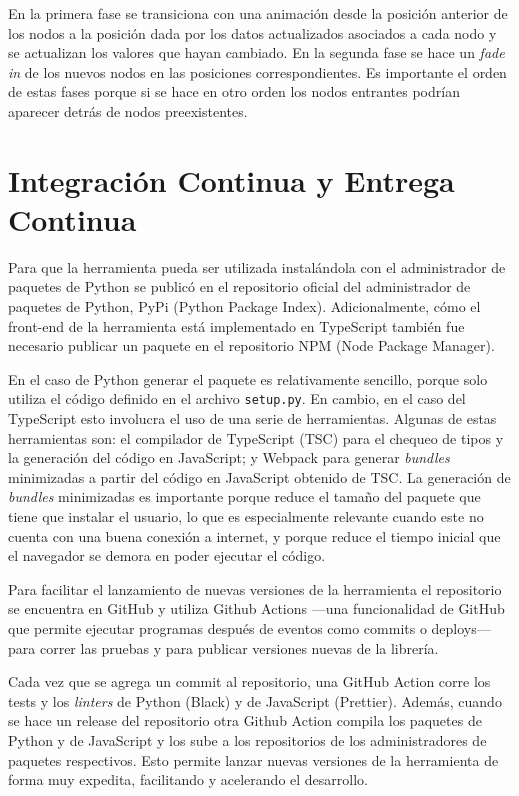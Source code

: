 En la primera fase se transiciona con una animación desde la posición anterior de los nodos a la posición dada por los datos actualizados asociados a cada nodo y se actualizan los valores que hayan cambiado. En la segunda fase se hace un \textit{fade in} de los nuevos nodos en las posiciones correspondientes. Es importante el orden de estas fases porque si se hace en otro orden los nodos entrantes podrían aparecer detrás de nodos preexistentes.

\section{Integración Continua y Entrega Continua}

Para que la herramienta pueda ser utilizada instalándola con el administrador de paquetes de Python se publicó en el repositorio oficial del administrador de paquetes de Python, PyPi (Python Package Index). Adicionalmente, cómo el front-end de la herramienta está implementado en TypeScript también fue necesario publicar un paquete en el repositorio NPM (Node Package Manager).

En el caso de Python generar el paquete es relativamente sencillo, porque solo utiliza el código definido en el archivo \texttt{setup.py}. En cambio, en el caso del TypeScript esto involucra el uso de una serie de herramientas. Algunas de estas herramientas son: el compilador de TypeScript (TSC) para el chequeo de tipos y la generación del código en JavaScript; y Webpack para generar \textit{bundles} minimizadas a partir del código en JavaScript obtenido de TSC. La generación de \textit{bundles} minimizadas es importante porque reduce el tamaño del paquete que tiene que instalar el usuario, lo que es especialmente relevante cuando este no cuenta con una buena conexión a internet, y porque reduce el tiempo inicial que el navegador se demora en poder ejecutar el código.

Para facilitar el lanzamiento de nuevas versiones de la herramienta el repositorio se encuentra en GitHub y utiliza Github Actions ---una funcionalidad de GitHub que permite ejecutar programas después de eventos como commits o deploys--- para correr las pruebas y para publicar versiones nuevas de la librería.

Cada vez que se agrega un commit al repositorio, una GitHub Action corre los tests y los \textit{linters} de Python (Black) y de JavaScript (Prettier). Además, cuando se hace un release del repositorio otra Github Action compila los paquetes de Python y de JavaScript y los sube a los repositorios de los administradores de paquetes respectivos. Esto permite lanzar nuevas versiones de la herramienta de forma muy expedita, facilitando y acelerando el desarrollo.
